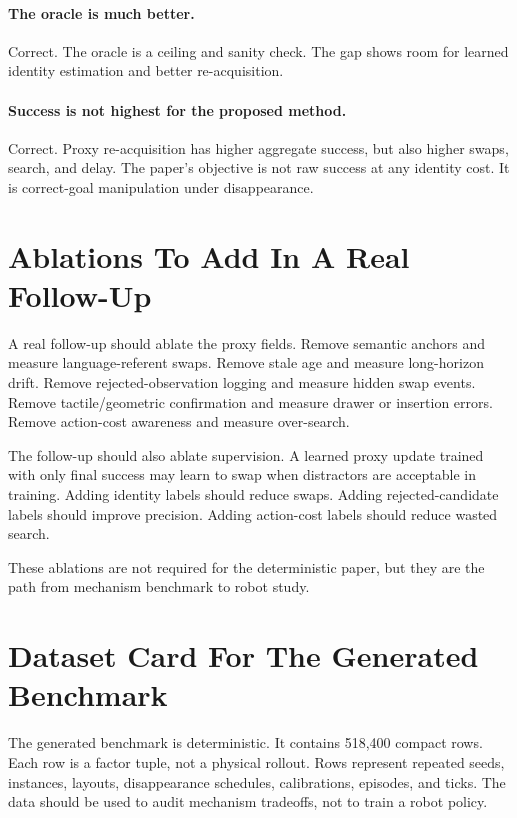 \paragraph{The oracle is much better.}
Correct. The oracle is a ceiling and sanity check. The gap shows room for learned identity estimation and better re-acquisition.

\paragraph{Success is not highest for the proposed method.}
Correct. Proxy re-acquisition has higher aggregate success, but also higher swaps, search, and delay. The paper's objective is not raw success at any identity cost. It is correct-goal manipulation under disappearance.

\section{Ablations To Add In A Real Follow-Up}

A real follow-up should ablate the proxy fields. Remove semantic anchors and measure language-referent swaps. Remove stale age and measure long-horizon drift. Remove rejected-observation logging and measure hidden swap events. Remove tactile/geometric confirmation and measure drawer or insertion errors. Remove action-cost awareness and measure over-search.

The follow-up should also ablate supervision. A learned proxy update trained with only final success may learn to swap when distractors are acceptable in training. Adding identity labels should reduce swaps. Adding rejected-candidate labels should improve precision. Adding action-cost labels should reduce wasted search.

These ablations are not required for the deterministic paper, but they are the path from mechanism benchmark to robot study.

\section{Dataset Card For The Generated Benchmark}

The generated benchmark is deterministic. It contains 518,400 compact rows. Each row is a factor tuple, not a physical rollout. Rows represent repeated seeds, instances, layouts, disappearance schedules, calibrations, episodes, and ticks. The data should be used to audit mechanism tradeoffs, not to train a robot policy.


